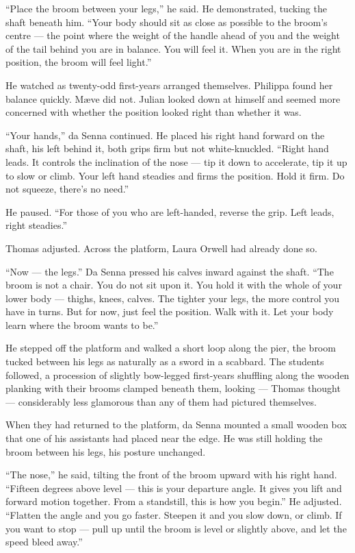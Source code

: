 \enquote{Place the broom between your legs,} he said. He demonstrated, tucking the shaft beneath him. \enquote{Your body should sit as close as possible to the broom's centre --- the point where the weight of the handle ahead of you and the weight of the tail behind you are in balance. You will feel it. When you are in the right position, the broom will feel light.}
 
He watched as twenty-odd first-years arranged themselves. Philippa found her balance quickly. Mæve did not. Julian looked down at himself and seemed more concerned with whether the position looked right than whether it was.
 
\enquote{Your hands,} da Senna continued. He placed his right hand forward on the shaft, his left behind it, both grips firm but not white-knuckled. \enquote{Right hand leads. It controls the inclination of the nose --- tip it down to accelerate, tip it up to slow or climb. Your left hand steadies and firms the position. Hold it firm. Do not squeeze, there's no need.}
 
He paused. \enquote{For those of you who are left-handed, reverse the grip. Left leads, right steadies.}
 
Thomas adjusted. Across the platform, Laura Orwell had already done so.
 
\enquote{Now --- the legs.} Da Senna pressed his calves inward against the shaft. \enquote{The broom is not a chair. You do not sit upon it. You hold it with the whole of your lower body --- thighs, knees, calves. The tighter your legs, the more control you have in turns. But for now, just feel the position. Walk with it. Let your body learn where the broom wants to be.}
 
He stepped off the platform and walked a short loop along the pier, the broom tucked between his legs as naturally as a sword in a scabbard. The students followed, a procession of slightly bow-legged first-years shuffling along the wooden planking with their brooms clamped beneath them, looking --- Thomas thought --- considerably less glamorous than any of them had pictured themselves.
 
When they had returned to the platform, da Senna mounted a small wooden box that one of his assistants had placed near the edge. He was still holding the broom between his legs, his posture unchanged.
 
\enquote{The nose,} he said, tilting the front of the broom upward with his right hand. \enquote{Fifteen degrees above level --- this is your departure angle. It gives you lift and forward motion together. From a standstill, this is how you begin.} He adjusted. \enquote{Flatten the angle and you go faster. Steepen it and you slow down, or climb. If you want to stop --- pull up until the broom is level or slightly above, and let the speed bleed away.}
 
